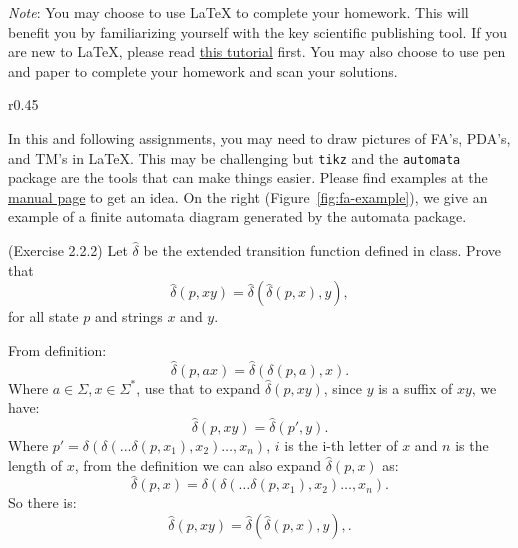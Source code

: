 \documentclass[10pt]{homework}
\begin{document}
\textit{Note}: You may choose to use LaTeX to complete your homework.
This will benefit you by familiarizing yourself with the key scientific
publishing tool.
If you are new to LaTeX, please read
\href{https://ctan.org/tex-archive/info/lshort/}{this tutorial} first.
You may also choose to use pen and paper to complete your homework and scan
your solutions.

\begin{wrapfigure}{r}{0.45\textwidth}
  \caption{An example of a finite automata.}\label{fig:fa-example}
\end{wrapfigure}

In this and following assignments, you may need to draw pictures of FA's, PDA's,
and TM's in LaTeX.
This may be challenging but \verb|tikz| and the \verb|automata| package are the
tools that can make things easier.
Please find examples at the \href{https://tikz.dev/library-automata}{manual
  page} to get an idea.
On the right (Figure~\ref{fig:fa-example}), we give an example of a finite
automata diagram generated by the automata package.

\vspace{2em}

\begin{problem} (Exercise 2.2.2)
  Let $\hat{\delta}$ be the extended transition function
  defined in class.
  Prove that
  \begin{equation*}
    \hat{\delta} (p, xy) = \hat{\delta} (\hat{\delta} (p, x), y),
  \end{equation*}
  for all state $p$ and strings $x$ and $y$.
\end{problem}

\begin{solution}
    From definition:
    \[
        \hat{\delta}(p,ax)=\hat{\delta}(\delta(p,a),x)
    .\] 
    Where $a\in \Sigma,x\in \Sigma^{*}$, use that to expand $\hat{\delta}(p,xy)$, since $y$ is a suffix of $xy$, we have:
    \[
        \hat{\delta}(p,xy)=\hat{\delta}(p',y)
    .\] 
    Where $p'=\delta(\delta(\ldots\delta(p,x_1),x_2)\ldots,x_n)$, $i$ is the i-th letter of $x$ and $n$ is the length of $x$, from the definition we can also expand $\hat{\delta}(p,x)$ as:
    \[
        \hat{\delta}(p,x)=\delta(\delta(\ldots\delta(p,x_1),x_2)\ldots,x_n)
    .\] 
    So there is:
    \[
        \hat{\delta} (p, xy) = \hat{\delta} (\hat{\delta} (p, x), y),
    .\] 
\end{solution}
\end{document}
